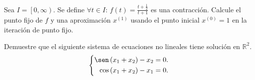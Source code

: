 
    \begin{solutionordottedlines}
    \end{solutionordottedlines}

    \question

    Sea $I=\left[0,\infty\right)$.
    Se define $\forall t\in I$:
    $f\left(t\right)=\frac{t+\frac{1}{2}}{t+1}$ es una contracción.
    Calcule el punto fijo de $f$ y una aproximación
    $x^{\left(1\right)}$ usando el punto inicial
    $x^{\left(0\right)}=1$ en la iteración de punto fijo.

    \begin{solutionordottedlines}
    \end{solutionordottedlines}

    \question

    Demuestre que el siguiente sistema de ecuaciones no lineales
    tiene solución en $\mathbb{R}^{2}$.
    \begin{equation*}
      \left\{
        \begin{aligned}
          \sen\left(x_{1}+x_{2}\right)-x_{2}&=
          0.\\
          \cos\left(x_{1}+x_{2}\right)-x_{1}&=
          0.
        \end{aligned}
        \right.
      \end{equation*}

